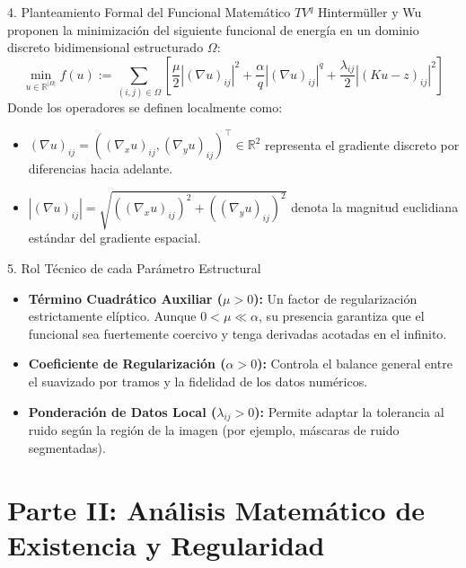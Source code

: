 \documentclass[aspectratio=169,11pt]{beamer}
\begin{document}
\begin{frame}{4. Planteamiento Formal del Funcional Matemático $TV^q$}
    Hintermüller y Wu proponen la minimización del siguiente funcional de energía en un dominio discreto bidimensional estructurado $\Omega$:
    \begin{equation}
        \min_{u \in \mathbb{R}^{|\Omega|}} f(u) := \sum_{(i,j) \in \Omega} \left[ \frac{\mu}{2} |(\nabla u)_{ij}|^2 + \frac{\alpha}{q} |(\nabla u)_{ij}|^q + \frac{\lambda_{ij}}{2} |(Ku - z)_{ij}|^2 \right]
    \end{equation}
    Donde los operadores se definen localmente como:
    \begin{itemize}
        \item $(\nabla u)_{ij} = ((\nabla_x u)_{ij}, (\nabla_y u)_{ij})^\top \in \mathbb{R}^2$ representa el gradiente discreto por diferencias hacia adelante.
        \item $|(\nabla u)_{ij}| = \sqrt{((\nabla_x u)_{ij})^2 + ((\nabla_y u)_{ij})^2}$ denota la magnitud euclidiana estándar del gradiente espacial.
    \end{itemize}
\end{frame}

\begin{frame}{5. Rol Técnico de cada Parámetro Estructural}
    \begin{itemize}
        \item \textbf{Término Cuadrático Auxiliar ($\mu > 0$):} Un factor de regularización estrictamente elíptico. Aunque $0 < \mu \ll \alpha$, su presencia garantiza que el funcional sea fuertemente coercivo y tenga derivadas acotadas en el infinito.
        \item \textbf{Coeficiente de Regularización ($\alpha > 0$):} Controla el balance general entre el suavizado por tramos y la fidelidad de los datos numéricos.
        \item \textbf{Ponderación de Datos Local ($\lambda_{ij} > 0$):} Permite adaptar la tolerancia al ruido según la región de la imagen (por ejemplo, máscaras de ruido segmentadas).
    \end{itemize}
\end{frame}

\section{Parte II: Análisis Matemático de Existencia y Regularidad}
\end{document}
